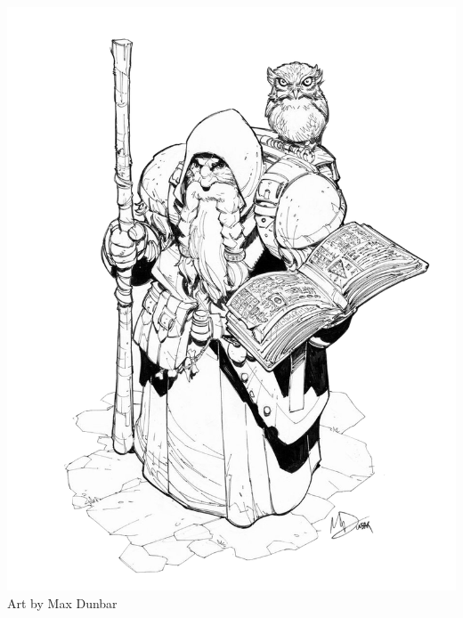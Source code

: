 \begin{multicols*}{2}

\begin{Figure}
\centering
\includegraphics[width=\textwidth]{img/wizard-2.png}
{\scriptsize Art by Max Dunbar}
\end{Figure}
    
\end{multicols*}

    